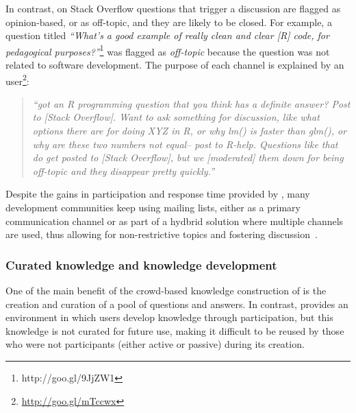 In contrast, on Stack Overflow questions that trigger a discussion are flagged as opinion-based, or as off-topic, and they are likely to be closed. 
For example, a question titled \textit{``What's a good example of really clean and clear [R] code, for pedagogical purposes?''}\footnote{http://goo.gl/9JjZW1} was flagged as \textit{off-topic} because the question was not related to software development.
The purpose of each channel is explained by an \RH user\footnote{\url{http://goo.gl/mTccwx}}:
    \begin{quote}
        \textit{``got an R programming question that you think has a definite answer? Post to [Stack Overflow]. Want to ask something for discussion, like what options there are for doing XYZ in R, or why lm() is faster than glm(), or why are these two numbers not equal-- post to R-help. Questions like that do get posted to [Stack Overflow], but we [moderated] them down for being off-topic and they disappear pretty quickly.''}
    \end{quote}

Despite the gains in participation and response time provided by \SO, many development communities keep using mailing lists, either as a primary communication channel or as part of a hydbrid solution where multiple channels are used, thus allowing for non-restrictive topics and fostering discussion~\cite{Squire2015a}.


\subsubsection{Curated knowledge and knowledge development}

One of the main benefit of the crowd-based knowledge construction of \SO is the creation and curation of a pool of questions and answers. In contrast, \RH provides an environment in which users
    develop knowledge through participation, but this knowledge is not curated for future use, making it difficult to be reused by those who were not
    participants (either active or passive) during its creation.


